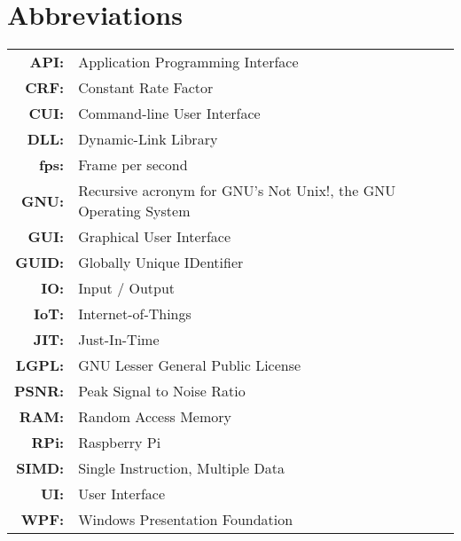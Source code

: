 \renewcommand{\baselinestretch}{1}
\chapter{Abbreviations}

\begin{tabular}{rl}
  \vspace{0.1em} \textbf{API:} & Application Programming Interface \\
  \vspace{0.1em} \textbf{CRF:} & Constant Rate Factor \\
  \vspace{0.1em} \textbf{CUI:} & Command-line User Interface \\
  \vspace{0.1em} \textbf{DLL:} & Dynamic-Link Library \\
  \vspace{0.1em} \textbf{fps:} & Frame per second \\
  \vspace{0.1em} \textbf{GNU:} & Recursive acronym for \ca{``}GNU's Not Unix!\ca{''}, the GNU Operating System \\
  \vspace{0.1em} \textbf{GUI:} & Graphical User Interface \\
  \vspace{0.1em} \textbf{GUID:} & Globally Unique IDentifier \\
  \vspace{0.1em} \textbf{IO:} & Input / Output \\
  \vspace{0.1em} \textbf{IoT:} & Internet-of-Things \\
  \vspace{0.1em} \textbf{JIT:} & Just-In-Time \\
  \vspace{0.1em} \textbf{LGPL:} & GNU Lesser General Public License \\
  \vspace{0.1em} \textbf{PSNR:} & Peak Signal to Noise Ratio \\
  \vspace{0.1em} \textbf{RAM:} & Random Access Memory \\
  \vspace{0.1em} \textbf{RPi:} & Raspberry Pi \\
  \vspace{0.1em} \textbf{SIMD:} & Single Instruction, Multiple Data \\
  \vspace{0.1em} \textbf{UI:} & User Interface \\
  \vspace{0.1em} \textbf{WPF:} & Windows Presentation Foundation \\
\end{tabular}

